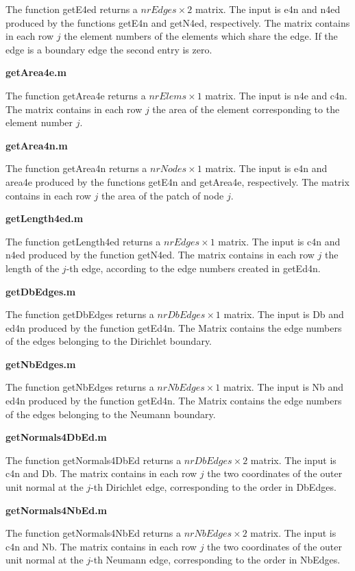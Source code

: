 The function getE4ed returns a $nrEdges \times 2$ matrix. The input  is e4n
and n4ed produced by the functions getE4n and getN4ed, respectively.
The matrix contains in each row $j$ the element numbers of the elements
which share the edge. If the edge is a boundary edge the second
entry is zero.\\
\medskip

{\bf \large getArea4e.m}\medskip

The function getArea4e returns a $nrElems \times 1$ matrix. The input is
n4e and c4n. The matrix contains in each row $j$ the area of the
element corresponding to the element number $j$. \medskip

{\bf \large getArea4n.m}\medskip

The function getArea4n returns a $nrNodes \times 1$ matrix. The input is
e4n and area4e produced by the functions getE4n and getArea4e,
respectively. The matrix contains in each row $j$ the area of the
patch of node $j$.\\ \medskip

{\bf \large getLength4ed.m}\medskip

The function getLength4ed returns a $nrEdges \times 1$ matrix. The input is
c4n and n4ed produced by the function getN4ed. The matrix contains in each row $j$
the length of the $j$-th edge, according to the edge numbers created in getEd4n.\medskip

{\bf \large getDbEdges.m}\medskip

The function getDbEdges returns a $nrDbEdges \times 1$ matrix. The input is 
Db and ed4n produced by the function getEd4n. The Matrix contains the edge numbers
of the edges belonging to the Dirichlet boundary.\medskip

{\bf \large getNbEdges.m}\medskip

The function getNbEdges returns a $nrNbEdges \times 1$ matrix. The input is 
Nb and ed4n produced by the function getEd4n. The Matrix contains the edge numbers
of the edges belonging to the Neumann boundary.\medskip

{\bf \large getNormals4DbEd.m}\medskip

The function getNormals4DbEd returns a $nrDbEdges \times 2$ matrix. The input 
is c4n and Db. The matrix contains in each row $j$ the two coordinates of the 
outer unit normal at the $j$-th Dirichlet edge, corresponding to the order in DbEdges.\medskip

{\bf \large getNormals4NbEd.m}\medskip

The function getNormals4NbEd returns a $nrNbEdges \times 2$ matrix. The input 
is c4n and Nb. The matrix contains in each row $j$ the two coordinates of the 
outer unit normal at the $j$-th Neumann edge, corresponding to the order in NbEdges.\medskip

